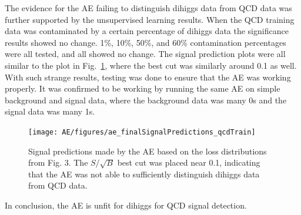 The evidence for the AE failing to distinguish dihiggs data from QCD data was further supported by the unsupervised learning results. When the QCD training data was contaminated by a certain percentage of dihiggs data the significance results showed no change. 1\%, 10\%, 50\%, and 60\% contamination percentages were all tested, and all showed no change. The signal prediction plots were all similar to the plot in Fig.~\ref{fig:ae_signalPred}, where the best cut was similarly around 0.1 as well. With such strange results, testing was done to ensure that the AE was working properly. It was confirmed to be working by running the same AE on simple background and signal data, where the background data was many 0s and the signal data was many 1s. %

\begin{figure}[!h] 
\begin{center}
\texttt{[image: AE/figures/ae\_finalSignalPredictions\_qcdTrain]}
\caption{Signal predictions made by the AE based on the loss distributions from Fig. 3. The $S/\sqrt{B}$ best cut was placed near 0.1, indicating that the AE was not able to sufficiently distinguish dihiggs data from QCD data.}
  \label{fig:ae_signalPred}
\end{center}
\end{figure}

In conclusion, the AE is unfit for dihiggs for QCD signal detection.

